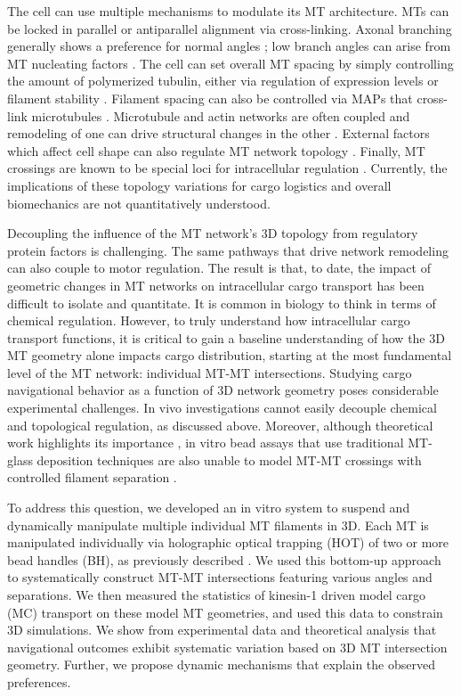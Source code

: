 The cell can use multiple mechanisms to modulate its MT architecture. MTs can be locked in parallel \cite{Fink2009} or antiparallel \cite{Subramanian2010} alignment via cross-linking. Axonal branching generally shows a preference for normal angles \cite{Kalil2013}; low branch angles can arise from MT nucleating factors \cite{Petry2013}. The cell can set overall MT spacing by simply controlling the amount of polymerized tubulin, either via regulation of expression levels \cite{Dumontet1996} or filament stability \cite{Desai1997}. Filament spacing can also be controlled via MAPs that cross-link microtubules \cite{Hirokawa1988}. Microtubule and actin networks are often coupled and remodeling of one can drive structural changes in the other \cite{Chesarone2010,Young2008}. External factors which affect cell shape can also regulate MT network topology \cite{Gomez2016}. Finally, MT crossings are known to be special loci for intracellular regulation \cite{Hamant2013}. Currently, the implications of these topology variations for cargo logistics and overall biomechanics are not quantitatively understood.
 
Decoupling the influence of the MT network's 3D topology from regulatory protein factors is challenging. The same pathways that drive network remodeling can also couple to motor regulation. The result is that, to date, the impact of geometric changes in MT networks on intracellular cargo transport has been difficult to isolate and quantitate. It is common in biology to think in terms of chemical regulation. However, to truly understand how intracellular cargo transport functions, it is critical to gain a baseline understanding of how the 3D MT geometry alone impacts cargo distribution, starting at the most fundamental level of the MT network: individual MT-MT intersections.
Studying cargo navigational behavior as a function of 3D network geometry poses considerable experimental challenges. In vivo investigations cannot easily decouple chemical and topological regulation, as discussed above. Moreover, although theoretical work highlights its importance \cite{Erickson2013}, in vitro bead assays that use traditional MT-glass deposition techniques are also unable to model MT-MT crossings with controlled filament separation \cite{Ross2008,Vershinin2007}.
 
To address this question, we developed an in vitro system to suspend and dynamically manipulate multiple individual MT filaments in 3D. Each MT is manipulated individually via holographic optical trapping (HOT) of two or more bead handles (BH), as previously described \cite{Bergman2015}. We used this bottom-up approach to systematically construct MT-MT intersections featuring various angles and separations. We then measured the statistics of kinesin-1 driven model cargo (MC) transport on these model MT geometries, and used this data to constrain 3D simulations. We show from experimental data and theoretical analysis that navigational outcomes exhibit systematic variation based on 3D MT intersection geometry. Further, we propose dynamic mechanisms that explain the observed preferences.

